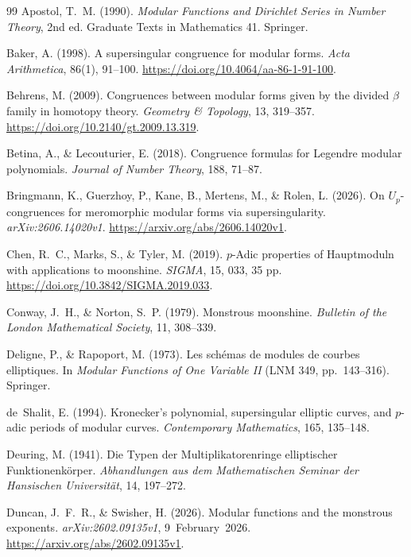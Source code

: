 \documentclass[11pt,a4paper]{article}
\numberwithin{equation}{section}
\theoremstyle{definition}
\theoremstyle{remark}
\begin{document}
\begin{thebibliography}{99}\small
{} Apostol, T.~M. (1990). \emph{Modular Functions and Dirichlet Series in Number Theory}, 2nd ed. Graduate Texts in Mathematics 41. Springer.

 Baker, A. (1998). A supersingular congruence for modular forms.
\emph{Acta Arithmetica}, 86(1), 91--100. \url{https://doi.org/10.4064/aa-86-1-91-100}.

 Behrens, M. (2009). Congruences between modular forms given by the divided $\beta$ family in homotopy theory. \emph{Geometry \& Topology}, 13, 319--357. \url{https://doi.org/10.2140/gt.2009.13.319}.

 Betina, A., \& Lecouturier, E. (2018). Congruence formulas for
Legendre modular polynomials. \emph{Journal of Number Theory}, 188, 71--87.

 Bringmann, K., Guerzhoy, P.,
Kane, B., Mertens, M., \& Rolen, L. (2026). On $U_p$-congruences for
meromorphic modular forms via supersingularity. \emph{arXiv:2606.14020v1}.
\url{https://arxiv.org/abs/2606.14020v1}.

 Chen, R.~C., Marks, S., \& Tyler, M. (2019).
$p$-Adic properties of Hauptmoduln with applications to moonshine.
\emph{SIGMA}, 15, 033, 35 pp. \url{https://doi.org/10.3842/SIGMA.2019.033}.


 Conway, J.~H., \& Norton, S.~P. (1979). Monstrous moonshine.
\emph{Bulletin of the London Mathematical Society}, 11, 308--339.

 Deligne, P., \& Rapoport, M. (1973). Les sch\'emas de modules de
courbes elliptiques. In \emph{Modular Functions of One Variable II} (LNM 349, pp.~143--316). Springer.

 de~Shalit, E. (1994). Kronecker's polynomial, supersingular elliptic curves,
and $p$-adic periods of modular curves. \emph{Contemporary Mathematics}, 165, 135--148.

 Deuring, M. (1941). Die Typen der Multiplikatorenringe elliptischer Funktionenk\"orper. \emph{Abhandlungen aus dem Mathematischen Seminar der Hansischen Universit\"at}, 14, 197--272.

 Duncan, J.~F.~R., \& Swisher, H. (2026).
Modular functions and the monstrous exponents. \emph{arXiv:2602.09135v1}, 9~February~2026. \url{https://arxiv.org/abs/2602.09135v1}.


\end{thebibliography}
\end{document}
